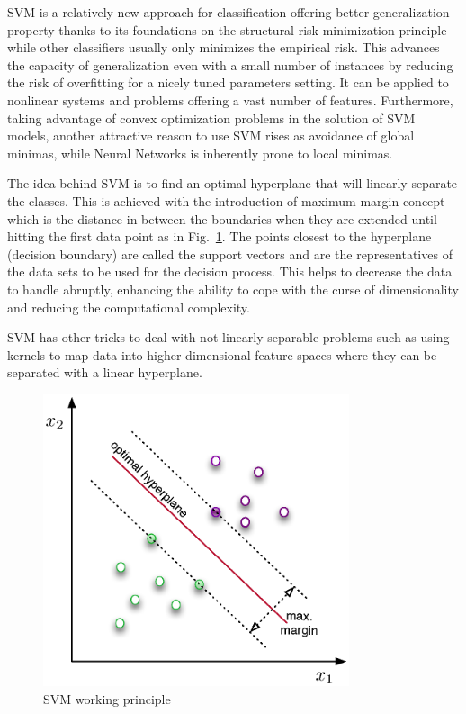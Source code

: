 SVM is a relatively new approach for classification offering better generalization property thanks to its foundations on the structural risk minimization principle \cite{gunn1998support,yin2014study} while other classifiers usually only minimizes the empirical risk. This advances the capacity of generalization even with a small number of instances by reducing the risk of overfitting for a nicely tuned parameters setting. It can be applied to nonlinear systems and problems offering a vast number of features. Furthermore, taking advantage of convex optimization problems in the solution of SVM models, another attractive reason to use SVM rises as avoidance of global minimas, while Neural Networks is inherently prone to local minimas.

The idea behind SVM is to find an optimal hyperplane that will linearly separate the classes. This is achieved with the introduction of maximum margin concept which is the distance in between the boundaries when they are extended until hitting the first data point as in Fig.~\ref{fig:svmHyperplane}. The points closest to the hyperplane (decision boundary) are called the support vectors and are the representatives of the data sets to be used for the decision process. This helps to decrease the data to handle abruptly, enhancing the ability to cope with the curse of dimensionality and reducing the computational complexity.

SVM has other tricks to deal with not linearly separable problems such as using kernels to map data into higher dimensional feature spaces where they can be separated with a linear hyperplane.

\begin{figure}
\begin{center}
\includegraphics[width=9cm]{figures/svmHyperplane}    %
\caption{SVM working principle} 
\label{fig:svmHyperplane}
\end{center}
\end{figure}

